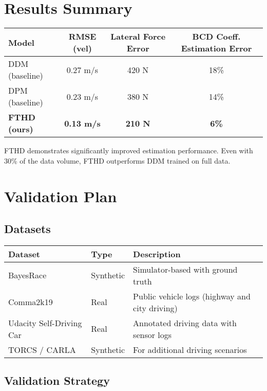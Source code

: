 \documentclass{article}
\begin{document}
\section{Results Summary}

\begin{tabular}{lccc}
\textbf{Model} & \textbf{RMSE (vel)} & \textbf{Lateral Force Error} & \textbf{BCD Coeff. Estimation Error} \\
\hline
DDM (baseline) & 0.27 m/s & 420 N & 18\% \\
DPM (baseline) & 0.23 m/s & 380 N & 14\% \\
\textbf{FTHD (ours)} & \textbf{0.13 m/s} & \textbf{210 N} & \textbf{6\%} \\
\end{tabular}

\vspace{0.3cm}
FTHD demonstrates significantly improved estimation performance. Even with 30\% of the data volume, FTHD outperforms DDM trained on full data.

\section{Validation Plan}

\subsection{Datasets}

\begin{tabular}{lll}
\textbf{Dataset} & \textbf{Type} & \textbf{Description} \\
\hline
BayesRace & Synthetic & Simulator-based with ground truth \\
Comma2k19 & Real & Public vehicle logs (highway and city driving) \\
Udacity Self-Driving Car & Real & Annotated driving data with sensor logs \\
TORCS / CARLA & Synthetic & For additional driving scenarios \\
\end{tabular}

\subsection{Validation Strategy}
\end{document}
